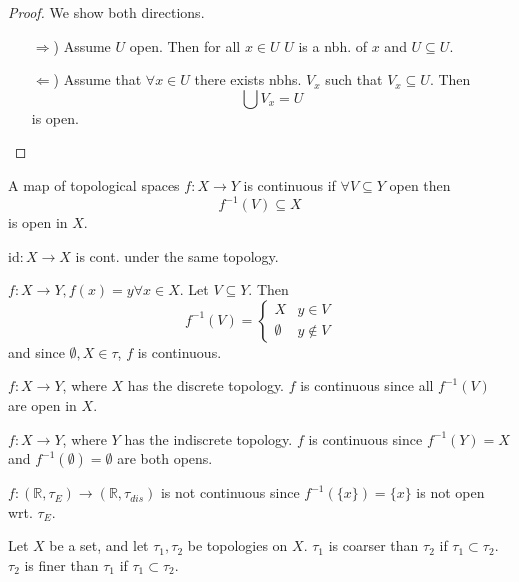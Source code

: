 \begin{proof} We show both directions.
  \begin{enumerate}
    \item[\( \Rightarrow \))] Assume \( U \) open. Then for all \( x \in U \)
      \( U \) is a nbh. of \( x \) and \( U \subseteq U \).
    \item[\( \Leftarrow \))] Assume that \( \forall x \in U \) there exists
      nbhs. \( V_x \) such that \( V_x \subseteq U \). Then
      \[
        \bigcup V_x = U
      \]
      is open.
  \end{enumerate}
\end{proof}

\begin{definition}[Continuity]
   A map of topological spaces \( f: X \to Y \)
   is continuous if \( \forall V \subseteq Y\) open
   then
   \[
    {f}^{-1} (V) \subseteq X
   \]
   is open in \( X \).
\end{definition}

\begin{example}
  \( \text{id}: X \to X \) is cont. under the same topology.
\end{example}

\begin{example}
    \( f:X \to Y, f(x) = y \forall x \in X \).
    Let \( V \subseteq Y \). Then
    \[
      {f}^{-1} (V) = \begin{cases}
        X & y \in V \\
        \emptyset & y \notin V
      \end{cases}
    \]
    and since \( \emptyset, X \in \tau \), \( f \) is continuous.
\end{example}

\begin{example}
    \( f: X \to Y \), where \( X \) has the discrete topology.
    \( f \) is continuous since all \( {f}^{-1} (V) \) are open in \( X \).
\end{example}

\begin{example}
    \( f: X \to Y \), where \( Y \) has the indiscrete topology.
    \( f \) is continuous since \( {f}^{-1} (Y) = X \) and \( {f}^{-1} (\emptyset) = \emptyset \)
    are both opens.
\end{example}

\begin{nonexample}
  \( f:(\mathbb{R}, \tau_E) \to (\mathbb{R}, \tau_{dis}) \) is not continuous
  since \( {f}^{-1} (\{x\}) = \{x\} \) is not open wrt. \( \tau_E \).
\end{nonexample}

\begin{definition}
  Let \( X \) be a set, and let \( \tau_1, \tau_2 \)
  be topologies on \( X \).
  \( \tau_1 \) is coarser than \( \tau_2 \) if \( \tau_1 \subset \tau_2  \).
  \( \tau_2 \) is finer than \( \tau_1 \) if \( \tau_1 \subset \tau_2  \).
\end{definition}
